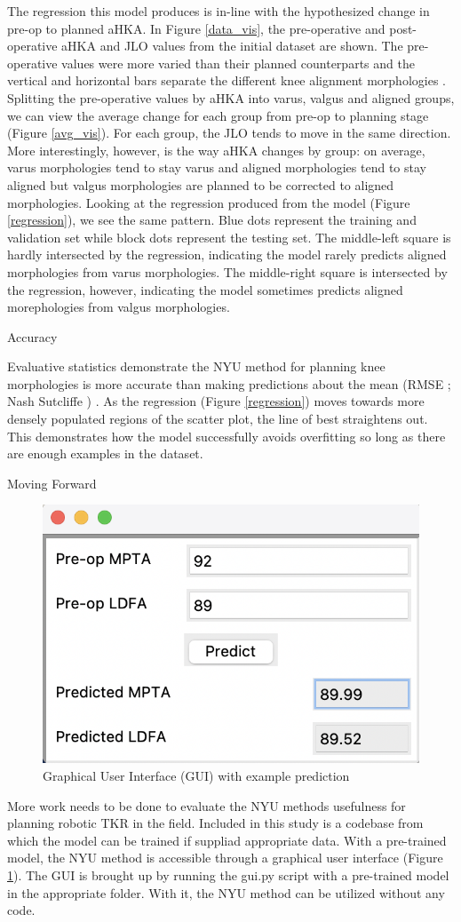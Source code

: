 \documentclass{article}
\begin{document}
	The regression this model produces is in-line with the hypothesized change in pre-op to planned aHKA.
In Figure \ref{data_vis}, the pre-operative and post-operative aHKA and JLO values from the initial dataset are shown.
The pre-operative values were more varied than their planned counterparts and the vertical and horizontal bars separate the different knee alignment morphologies \cite{cpak-paper}.
Splitting the pre-operative values by aHKA into varus, valgus and aligned groups, we can view the average change for each group from pre-op to planning stage (Figure \ref{avg_vis}).
For each group, the JLO tends to move in the same direction. More interestingly, however, is the way aHKA changes by group: 
on average, varus morphologies tend to stay varus and aligned morphologies tend to stay aligned but valgus morphologies are planned to be corrected to aligned morphologies.
Looking at the regression produced from the model (Figure \ref{regression}), we see the same pattern.
Blue dots represent the training and validation set while block dots represent the testing set.
The middle-left square is hardly intersected by the regression, indicating the model rarely predicts aligned morphologies from varus morphologies.
The middle-right square is intersected by the regression, however, indicating the model sometimes predicts aligned morephologies from valgus morphologies.

Accuracy

	Evaluative statistics demonstrate the NYU method for planning knee morphologies is more accurate than making predictions about the mean
(RMSE \rmse; Nash Sutcliffe \ns) \cite{goodness-of-fit}. 
As the regression (Figure \ref{regression}) moves towards more densely populated regions of the scatter plot, the line of best straightens out.
This demonstrates how the model successfully avoids overfitting so long as there are enough examples in the dataset.

Moving Forward

\begin{figure}[h]
	\centering
	\includegraphics[width=.5\linewidth]{gui.png}
	\caption{Graphical User Interface (GUI) with example prediction}
	\label{gui}
\end{figure}

	More work needs to be done to evaluate the NYU methods usefulness for planning robotic TKR in the field.
Included in this study is a codebase from which the model can be trained if suppliad appropriate data. With a pre-trained model,
the NYU method is accessible through a graphical user interface (Figure \ref{gui}).
The GUI is brought up by running the gui.py script with a pre-trained model in the appropriate folder.
With it, the NYU method can be utilized without any code.

\medskip

\printbibliography
\end{document}
